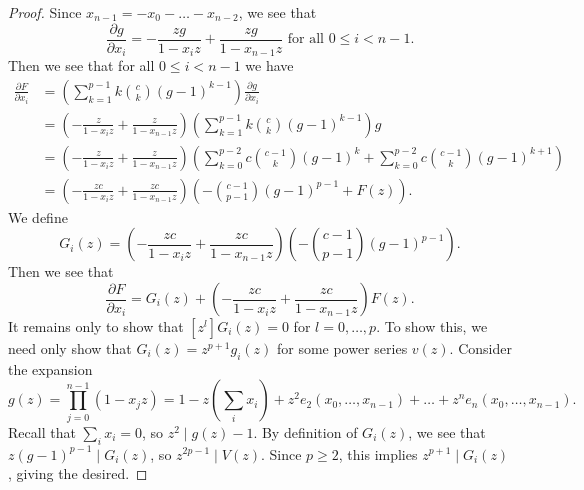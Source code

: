 \documentclass{amsart}
\numberwithin{equation}{section}
\theoremstyle{definition}
\begin{document}
\begin{proof}

Since $x_{n-1}=-x_0-\dots-x_{n-2}$, we see that
\[
\frac{\partial g}{\partial x_i}=-\frac{zg}{1-x_iz}+\frac{zg}{1-x_{n-1}z} \text{ for all $0 \le i < n-1$}.
\]
Then we see that for all $0 \le i < n-1$ we have 
\begin{align*}
\frac{\partial F}{\partial x_i}%
&=\left(\sum_{k=1}^{p-1}k\binom{c}{k}(g-1)^{k-1}\right)\frac{\partial g}{\partial x_i}\\
&=\left(-\frac{z}{1-x_iz}+\frac{z}{1-x_{n-1}z}\right)\left(\sum_{k=1}^{p-1}k\binom{c}{k}(g-1)^{k-1}\right)g\\
&=\left(-\frac{z}{1-x_iz}+\frac{z}{1-x_{n-1}z}\right)\left(\sum_{k=0}^{p-2}c\binom{c-1}{k}(g-1)^{k}+\sum_{k=0}^{p-2}c\binom{c-1}{k}(g-1)^{k+1}\right)\\
&=\left(-\frac{zc}{1-x_iz}+\frac{zc}{1-x_{n-1}z}\right)\left(-\binom{c-1}{p-1}(g-1)^{p-1}+F(z)\right).
\end{align*}
We define
\[
G_i(z)=\left(-\frac{zc}{1-x_iz}+\frac{zc}{1-x_{n-1}z}\right)\left(-\binom{c-1}{p-1}(g-1)^{p-1}\right).
\]
Then we see that
\[
\frac{\partial F}{\partial x_i}=G_i(z)+\left(-\frac{zc}{1-x_iz}+\frac{zc}{1-x_{n-1}z}\right)F(z).
\]
It remains only to show that $[z^l]G_i(z)=0$ for $l=0,\dots,p$. To show this, we need only show that $G_i(z)=z^{p+1}g_i(z)$ for some power series $v(z)$.  Consider the expansion 
\[
g(z)=\prod_{j=0}^{n-1} (1-x_jz) = 1-z\left(\sum_i x_i\right)+z^2e_2(x_0, \ldots, x_{n-1})+\dots+z^ne_n(x_0, \ldots, x_{n - 1}).
\]
Recall that $\sum_i x_i = 0$, so $z^2 \mid g(z)-1$.  By definition of $G_i(z)$, we see that $z(g-1)^{p-1} \mid G_i(z)$, so $z^{2p-1} \mid V(z)$. Since $p \ge 2$, this implies $z^{p+1} \mid G_i(z)$, giving the desired.
\end{proof}
\end{document}
